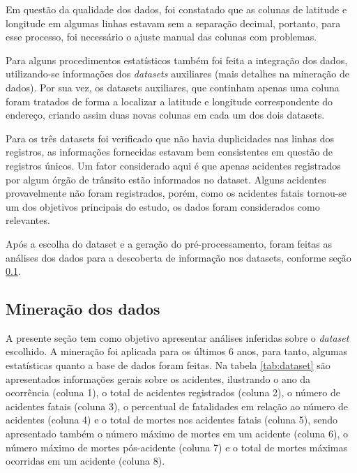 \documentclass[11pt,article,oneside,a4paper]{abntex2}
\begin{document}
Em questão da qualidade dos dados, foi constatado que as colunas de latitude e longitude em algumas linhas estavam sem a separação decimal, portanto, para esse processo, foi necessário o ajuste manual das colunas com problemas.

Para alguns procedimentos estatísticos também foi feita a integração dos dados, utilizando-se informações dos \textit{datasets} auxiliares (mais detalhes na mineração de dados). Por sua vez, os datasets auxiliares, que continham apenas uma coluna foram tratados de forma a localizar a latitude e longitude correspondente do endereço, criando assim duas novas colunas em cada um dos dois datasets.

Para os três datasets foi verificado que não havia duplicidades nas linhas dos registros, as informações fornecidas estavam bem consistentes em questão de registros únicos. Um fator considerado aqui é que apenas acidentes registrados por algum órgão de trânsito estão informados no dataset. Alguns acidentes provavelmente não foram registrados, porém, como os acidentes fatais tornou-se um dos objetivos principais do estudo, os dados foram considerados como relevantes.

Após a escolha do dataset e a geração do pré-processamento, foram feitas as análises dos dados para a descoberta de informação nos datasets, conforme seção \ref{subsec:mineration}.

\subsection{Mineração dos dados}
\label{subsec:mineration}

A presente seção tem como objetivo apresentar análises inferidas sobre o \textit{dataset} escolhido. A mineração foi aplicada para os últimos 6 anos, para tanto, algumas estatísticas quanto a base de dados foram feitas. Na tabela \ref{tab:dataset} são apresentados informações gerais sobre os acidentes, ilustrando o ano da ocorrência (coluna 1), o total de acidentes registrados (coluna 2), o número de acidentes fatais (coluna 3), o percentual de fatalidades em relação ao número de acidentes (coluna 4) e o total de mortes nos acidentes fatais (coluna 5), sendo apresentado também o número máximo de mortes em um acidente (coluna 6), o número máximo de mortes pós-acidente (coluna 7) e o total de mortes máximas ocorridas em um acidente (coluna 8).
\end{document}
